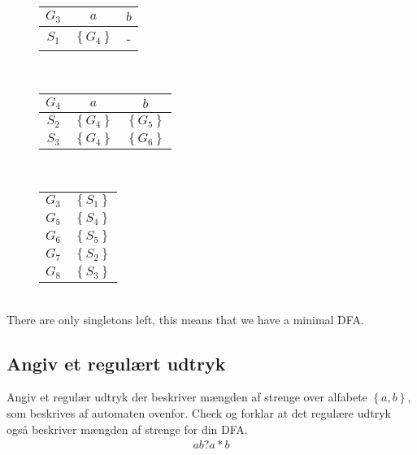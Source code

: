 \documentclass[11pt,a4paper]{article}
\begin{document}
\begin{figure}[!ht]\label{fig:mindfa:g3}
  \centering
  \begin{tabular}{c|cc}
    $G_3$ & $a$ & $b$\\\hline
    $S_1$ & $\left\{G_4\right\}$ & -
  \end{tabular}
\end{figure}\\
\begin{figure}[!ht]\label{fig:mindfa:g4}
  \centering
  \begin{tabular}{c|cc}
    $G_4$ & $a$ & $b$\\\hline
    $S_2$ & $\left\{G_4\right\}$ & $\left\{G_5\right\}$\\
    $S_3$ & $\left\{G_4\right\}$ & $\left\{G_6\right\}$
  \end{tabular}
\end{figure}\\
\begin{figure}[!ht]\label{fig:mindfa:newgs}
  \centering
  \begin{tabular}{c|c}
    $G_3$ & $\left\{S_1\right\}$\\
    $G_5$ & $\left\{S_4\right\}$\\
    $G_6$ & $\left\{S_5\right\}$\\
    $G_7$ & $\left\{S_2\right\}$\\
    $G_8$ & $\left\{S_3\right\}$\\
  \end{tabular}
\end{figure}\\
There are only singletons left, this means that we have a minimal DFA.
\subsection{Angiv et regulært udtryk}
Angiv et regulær udtryk der beskriver mængden af strenge over alfabete $\left\{a, b\right\}$, som beskrives af automaten ovenfor. Check og forklar at det regulære udtryk også beskriver mængden af strenge for din DFA.
\begin{align}
  ab?a*b
\end{align}
\end{document}
